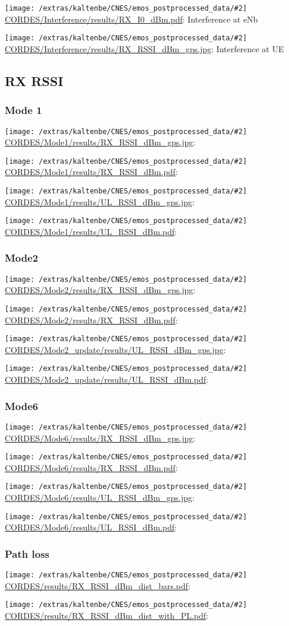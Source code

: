 \documentclass[a4paper,10pt]{article}
\newcommand{\printfile}[2][]{
 \begin{minipage}{8cm}
  \centering
  \texttt{[image: /extras/kaltenbe/CNES/emos\_postprocessed\_data/\#2]}
  \url{#2}: #1

 \end{minipage}
}
\begin{document}
\printfile[Interference at eNb]{CORDES/Interference/results/RX_I0_dBm.pdf}
\printfile[Interference at UE]{CORDES/Interference/results/RX_RSSI_dBm_gps.jpg}


\subsection{RX RSSI}


%  

\subsubsection{Mode 1}
\printfile{CORDES/Mode1/results/RX_RSSI_dBm_gps.jpg}
\printfile{CORDES/Mode1/results/RX_RSSI_dBm.pdf}

\printfile{CORDES/Mode1/results/UL_RSSI_dBm_gps.jpg}
\printfile{CORDES/Mode1/results/UL_RSSI_dBm.pdf}

\subsubsection{Mode2}

\printfile{CORDES/Mode2/results/RX_RSSI_dBm_gps.jpg}
\printfile{CORDES/Mode2/results/RX_RSSI_dBm.pdf}

\printfile{CORDES/Mode2_update/results/UL_RSSI_dBm_gps.jpg}
\printfile{CORDES/Mode2_update/results/UL_RSSI_dBm.pdf}

\subsubsection{Mode6}
\printfile{CORDES/Mode6/results/RX_RSSI_dBm_gps.jpg}
\printfile{CORDES/Mode6/results/RX_RSSI_dBm.pdf}

\printfile{CORDES/Mode6/results/UL_RSSI_dBm_gps.jpg}
\printfile{CORDES/Mode6/results/UL_RSSI_dBm.pdf}

\subsubsection{Path loss}
\printfile{CORDES/results/RX_RSSI_dBm_dist_bars.pdf}
\printfile{CORDES/results/RX_RSSI_dBm_dist_with_PL.pdf}
\end{document}
